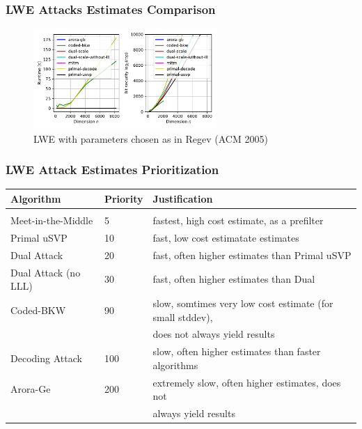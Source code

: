 \documentclass[t, aspectratio=169]{beamer}
\begin{document}
\begin{frame}
    \frametitle{LWE Attacks Estimates Comparison} %
    \begin{figure}
        \centering
        \includegraphics[width=0.62\textwidth]{../thesis/graphics/LWE_plot_Regev_long.pdf}
        \caption{LWE with parameters chosen as in Regev (ACM 2005)}
    \end{figure}
\end{frame}
\begin{frame}
    \frametitle{LWE Attack Estimates Prioritization}
    \begin{tabular}{lll}
        Algorithm            & Priority & Justification                                             \\\hline \\[-1em]
        Meet-in-the-Middle   & 5        & fastest, high cost estimate, as a prefilter               \\
        Primal uSVP          & 10       & fast, low cost estimatate estimates                       \\
        Dual Attack          & 20       & fast, often higher estimates than Primal uSVP             \\
        Dual Attack (no LLL) & 30       & fast, often higher estimates than Dual                    \\
        Coded-BKW            & 90       & slow, somtimes very low cost estimate (for small stddev), \\
                             &          & does not always yield results                             \\
        Decoding Attack      & 100      & slow, often higher estimates than faster algorithms       \\
        Arora-Ge             & 200      & extremely slow, often higher estimates, does not          \\
                             &          & always yield results                                      \\
    \end{tabular}
\end{frame}
\end{document}
